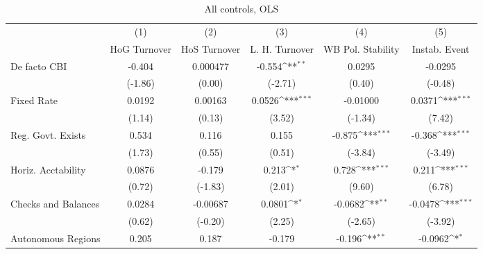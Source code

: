 \begin{table}[htbp]\centering
\def\sym#1{\ifmmode^{#1}\else\(^{#1}\)\fi}
\caption{All controls, OLS \label{fullcmultIndOLSDF}}
\begin{tabular}{l*{5}{c}}
\toprule
                                        &\multicolumn{1}{c}{(1)}&\multicolumn{1}{c}{(2)}&\multicolumn{1}{c}{(3)}&\multicolumn{1}{c}{(4)}&\multicolumn{1}{c}{(5)}\\
                                        &\multicolumn{1}{c}{HoG Turnover}&\multicolumn{1}{c}{HoS Turnover}&\multicolumn{1}{c}{L. H. Turnover}&\multicolumn{1}{c}{WB Pol. Stability}&\multicolumn{1}{c}{Instab. Event}\\
\midrule
De facto CBI                            &   -0.404         & 0.000477         &   -0.554\sym{**} &   0.0295         &  -0.0295         \\
                                        &  (-1.86)         &   (0.00)         &  (-2.71)         &   (0.40)         &  (-0.48)         \\
\addlinespace
Fixed Rate                              &   0.0192         &  0.00163         &   0.0526\sym{***}& -0.01000         &   0.0371\sym{***}\\
                                        &   (1.14)         &   (0.13)         &   (3.52)         &  (-1.34)         &   (7.42)         \\
\addlinespace
Reg. Govt. Exists                       &    0.534         &    0.116         &    0.155         &   -0.875\sym{***}&   -0.368\sym{***}\\
                                        &   (1.73)         &   (0.55)         &   (0.51)         &  (-3.84)         &  (-3.49)         \\
\addlinespace
Horiz. Acctability                      &   0.0876         &   -0.179         &    0.213\sym{*}  &    0.728\sym{***}&    0.211\sym{***}\\
                                        &   (0.72)         &  (-1.83)         &   (2.01)         &   (9.60)         &   (6.78)         \\
\addlinespace
Checks and Balances                     &   0.0284         & -0.00687         &   0.0801\sym{*}  &  -0.0682\sym{**} &  -0.0478\sym{***}\\
                                        &   (0.62)         &  (-0.20)         &   (2.25)         &  (-2.65)         &  (-3.92)         \\
\addlinespace
Autonomous Regions                      &    0.205         &    0.187         &   -0.179         &   -0.196\sym{**} &  -0.0962\sym{*}  \\

\end{tabular}
\end{table}
